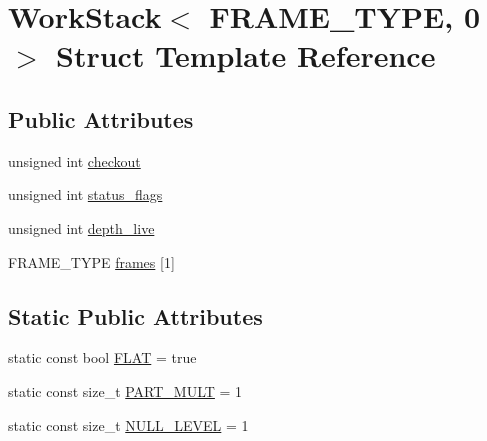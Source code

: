 \hypertarget{structWorkStack_3_01FRAME__TYPE_00_010_01_4}{\section{Work\-Stack$<$ F\-R\-A\-M\-E\-\_\-\-T\-Y\-P\-E, 0 $>$ Struct Template Reference}
\label{structWorkStack_3_01FRAME__TYPE_00_010_01_4}
}
\subsection*{Public Attributes}
\begin{DoxyCompactItemize}
\item 
unsigned int \hyperlink{structWorkStack_3_01FRAME__TYPE_00_010_01_4_ab014d043b3a22f72a6abc16b11b8eeb4}{checkout}
\item 
unsigned int \hyperlink{structWorkStack_3_01FRAME__TYPE_00_010_01_4_a541f97342c2d933c880b73c7003305eb}{status\-\_\-flags}
\item 
unsigned int \hyperlink{structWorkStack_3_01FRAME__TYPE_00_010_01_4_a81fc3684b4f5f68e3c7fd820f8d533cd}{depth\-\_\-live}
\item 
F\-R\-A\-M\-E\-\_\-\-T\-Y\-P\-E \hyperlink{structWorkStack_3_01FRAME__TYPE_00_010_01_4_a850ac20c70d1abdcb189c367e3b0f984}{frames} \mbox{[}1\mbox{]}
\end{DoxyCompactItemize}
\subsection*{Static Public Attributes}
\begin{DoxyCompactItemize}
\item 
static const bool \hyperlink{structWorkStack_3_01FRAME__TYPE_00_010_01_4_abe93d19be620f72321619c2a88aedb1e}{F\-L\-A\-T} = true
\item 
static const size\-\_\-t \hyperlink{structWorkStack_3_01FRAME__TYPE_00_010_01_4_a98cd4361aac1ca0ad1420073315d666b}{P\-A\-R\-T\-\_\-\-M\-U\-L\-T} = 1
\item 
static const size\-\_\-t \hyperlink{structWorkStack_3_01FRAME__TYPE_00_010_01_4_a4dba375e780fda0633898060162a9161}{N\-U\-L\-L\-\_\-\-L\-E\-V\-E\-L} = 1
\end{DoxyCompactItemize}


